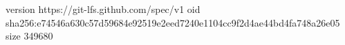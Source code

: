 version https://git-lfs.github.com/spec/v1
oid sha256:e74546a630c57d59684e92519e2eed7240e1104cc9f2d4ae44bd4fa748a26e05
size 349680
